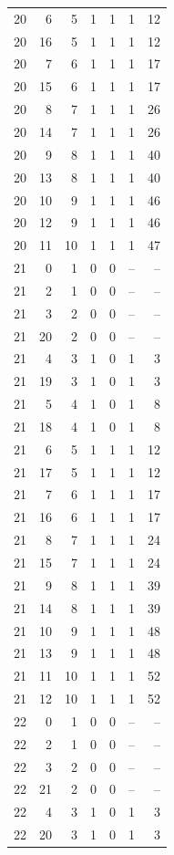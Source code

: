 \begin{longtable}{rrrrrrr}
20 & 6 & 5 & 1 & 1 & 1 & 12\\
20 & 16 & 5 & 1 & 1 & 1 & 12\\
20 & 7 & 6 & 1 & 1 & 1 & 17\\
20 & 15 & 6 & 1 & 1 & 1 & 17\\
20 & 8 & 7 & 1 & 1 & 1 & 26\\
20 & 14 & 7 & 1 & 1 & 1 & 26\\
20 & 9 & 8 & 1 & 1 & 1 & 40\\
20 & 13 & 8 & 1 & 1 & 1 & 40\\
20 & 10 & 9 & 1 & 1 & 1 & 46\\
20 & 12 & 9 & 1 & 1 & 1 & 46\\
20 & 11 & 10 & 1 & 1 & 1 & 47\\
21 & 0 & 1 & 0 & 0 & -- & --\\
21 & 2 & 1 & 0 & 0 & -- & --\\
21 & 3 & 2 & 0 & 0 & -- & --\\
21 & 20 & 2 & 0 & 0 & -- & --\\
21 & 4 & 3 & 1 & 0 & 1 & 3\\
21 & 19 & 3 & 1 & 0 & 1 & 3\\
21 & 5 & 4 & 1 & 0 & 1 & 8\\
21 & 18 & 4 & 1 & 0 & 1 & 8\\
21 & 6 & 5 & 1 & 1 & 1 & 12\\
21 & 17 & 5 & 1 & 1 & 1 & 12\\
21 & 7 & 6 & 1 & 1 & 1 & 17\\
21 & 16 & 6 & 1 & 1 & 1 & 17\\
21 & 8 & 7 & 1 & 1 & 1 & 24\\
21 & 15 & 7 & 1 & 1 & 1 & 24\\
21 & 9 & 8 & 1 & 1 & 1 & 39\\
21 & 14 & 8 & 1 & 1 & 1 & 39\\
21 & 10 & 9 & 1 & 1 & 1 & 48\\
21 & 13 & 9 & 1 & 1 & 1 & 48\\
21 & 11 & 10 & 1 & 1 & 1 & 52\\
21 & 12 & 10 & 1 & 1 & 1 & 52\\
22 & 0 & 1 & 0 & 0 & -- & --\\
22 & 2 & 1 & 0 & 0 & -- & --\\
22 & 3 & 2 & 0 & 0 & -- & --\\
22 & 21 & 2 & 0 & 0 & -- & --\\
22 & 4 & 3 & 1 & 0 & 1 & 3\\
22 & 20 & 3 & 1 & 0 & 1 & 3\\

\end{longtable}
